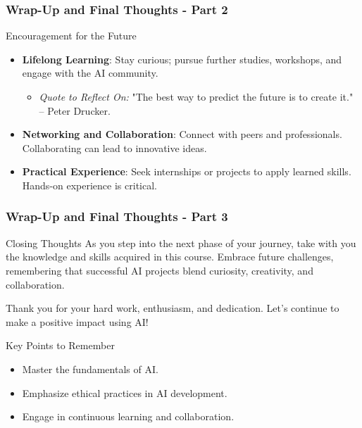 \documentclass[aspectratio=169]{beamer}
\begin{document}
\begin{frame}[fragile]
    \frametitle{Wrap-Up and Final Thoughts - Part 2}

    \begin{block}{Encouragement for the Future}
        \begin{itemize}
            \item \textbf{Lifelong Learning}: Stay curious; pursue further studies, workshops, and engage with the AI community.
                \begin{itemize}
                    \item \textit{Quote to Reflect On:} "The best way to predict the future is to create it." – Peter Drucker.
                \end{itemize}
            \item \textbf{Networking and Collaboration}: Connect with peers and professionals. Collaborating can lead to innovative ideas.
            \item \textbf{Practical Experience}: Seek internships or projects to apply learned skills. Hands-on experience is critical.
        \end{itemize}
    \end{block}
\end{frame}

\begin{frame}[fragile]
    \frametitle{Wrap-Up and Final Thoughts - Part 3}

    \begin{block}{Closing Thoughts}
        As you step into the next phase of your journey, take with you the knowledge and skills acquired in this course. Embrace future challenges, remembering that successful AI projects blend curiosity, creativity, and collaboration. 

        Thank you for your hard work, enthusiasm, and dedication. Let’s continue to make a positive impact using AI!
    \end{block}
    
    \begin{block}{Key Points to Remember}
        \begin{itemize}
            \item Master the fundamentals of AI.
            \item Emphasize ethical practices in AI development.
            \item Engage in continuous learning and collaboration.
        \end{itemize}
    \end{block}
\end{frame}
\end{document}
